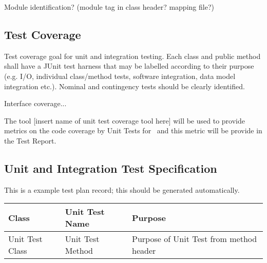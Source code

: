Module identification? (module tag in class header? mapping file?)

\subsection{Test Coverage}

Test coverage goal for unit and integration testing. Each class and public method shall have a JUnit test harness that may be labelled according to their purpose (e.g. I/O, individual class/method tests, software integration, data model integration etc.). Nominal and contingency
tests should be clearly identified.

Interface coverage...

The tool [insert name of unit test coverage tool here] will be used to provide metrics on the code coverage by Unit Tests for \product \ and this metric will be provide in the Test Report.

\subsection{Unit and Integration Test Specification}

This is a example test plan record; this should be generated automatically.

\begin{longtable} {|p{}|p{}|p{}|}\hline
{\bf Class} & {\bf Unit Test Name} & {\bf Purpose}  \\\hline
Unit Test Class & 
Unit Test Method & 
Purpose of Unit Test from method header \\\hline
\end{longtable}






